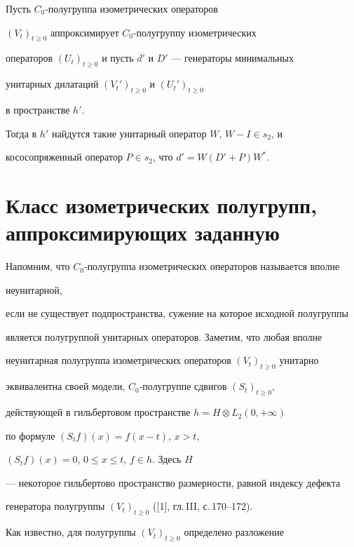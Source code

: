 \begin{prop}


Пусть $C_0$-полугруппа изометрических операторов


$(V_t)_{t\geq 0}$ аппроксимирует $C_0$-полугруппу изометрических


операторов $(U_t)_{t\geq 0}$ и пусть $d'$ и $D'$ --- генераторы минимальных


унитарных дилатаций $(V_t')_{t\geq 0}$ и $(U_t')_{t\geq 0}$


в пространстве $h'$.


Тогда в $h'$ найдутся такие унитарный оператор $W$, $W-I\in s_2$, и


кососопряженный оператор $P\in s_2$, что $d'=W(D'+P)W^*$.


\end{prop}





\section{Класс изометрических полугрупп, аппроксимирующих заданную}








Напомним, что $C_0$-полугруппа изометрических операторов называется вполне


неунитарной,


если не существует подпространства, сужение на которое исходной полугруппы


является полугруппой унитарных операторов. Заметим, что любая вполне


неунитарная полугруппа изометрических операторов $(V_t)_{t\geq 0}$ унитарно


эквивалентна своей модели, $C_0$-полугруппе сдвигов $(S_t)_{t\geq 0}$,


действующей в гильбертовом пространстве $h=H\otimes L_2(0,+\infty)$


по формуле $(S_tf)(x)=f(x-t)$, $x>t$,


$(S_tf)(x)=0$, $0\leq x\leq t$, $f\in h$. Здесь $H$


--- некоторое гильбертово пространство размерности, равной индексу дефекта


генератора полугруппы $(V_t)_{t\geq 0}$ ([1], гл.\,III, с.\,170--172).


Как известно, для полугруппы $(V_t)_{t\geq 0}$ определено разложение



